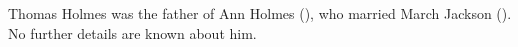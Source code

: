 
Thomas Holmes was the father of Ann Holmes (), who married March Jackson ().  No further details are known about him.
